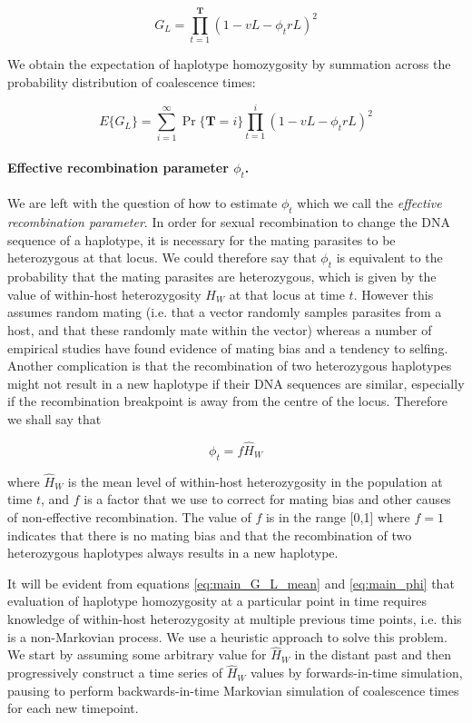 \documentclass[_main.tex]{subfiles}
\begin{document}
\begin{equation*}
G_L = \prod_{t=1}^\textbf{T}(1 - v L - \phi_t r L )^2
\end{equation*}

We obtain the expectation of haplotype homozygosity by summation across the probability distribution of coalescence times:

\begin{equation}
E \{ G_L \} = \sum_{i=1}^\infty \Pr \{ \textbf{T} = i \} \prod_{t=1}^i (1 - vL - \phi_t rL)^2
\label{eq:main_G_L_mean} 
\end{equation}

\paragraph{Effective recombination parameter $\phi_t$.} We are left with the question of how to estimate $\phi_t$ which we call the \textit{effective recombination parameter}.   In order for sexual recombination to change the DNA sequence of a haplotype, it is necessary for the mating parasites to be heterozygous at that locus.  We could therefore say that $\phi_t$ is equivalent to the probability that the mating parasites are heterozygous, which is given by the value  of within-host heterozygosity $H_W$ at that locus at time $t$.  However this assumes random mating (i.e. that a vector randomly samples parasites from a host, and that these randomly mate within the vector) whereas a number of empirical studies have found evidence of mating bias and a tendency to selfing.  Another complication is that the recombination of two heterozygous haplotypes might not result in a new haplotype if their DNA sequences are similar, especially if the recombination breakpoint is away from the centre of the locus. Therefore we shall say that 

\begin{equation}
\phi_t = f \widehat{H}_W
\label{eq:main_phi} 
\end{equation}

where $\widehat{H}_W$ is the mean level of within-host heterozygosity in the population at time $t$, and $f$ is a factor that we use to correct for mating bias and other causes of non-effective recombination.  The value of $f$ is in the range [0,1] where $f=1$ indicates that there is no mating bias and that the recombination of two heterozygous haplotypes always results in a new haplotype.

It will be evident from equations \ref {eq:main_G_L_mean} and \ref{eq:main_phi} that evaluation of haplotype homozygosity at a particular point in time requires knowledge of within-host heterozygosity at multiple previous time points, i.e. this is a non-Markovian process.  We use a heuristic approach to solve this problem.  We start by assuming some arbitrary value for $\widehat{H}_W$ in the distant past and then progressively construct a time series of $\widehat{H}_W$ values by forwards-in-time simulation, pausing to perform backwards-in-time Markovian simulation of coalescence times for each new timepoint.
\end{document}
